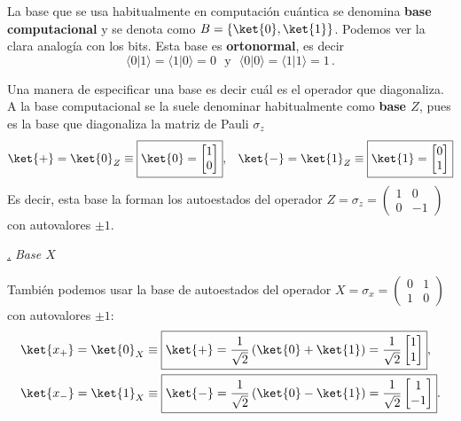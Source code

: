 \documentclass[a4paper,11pt]{book} %
\numberwithin{equation}{chapter}
\def\lp{\left(}
\def\rp{\right)}
\newcommand{\braket}[2]{\langle #1|#2\rangle}
\def\subsubiContadorIt{\par\addtocounter{subsubsection}{1}\underline{\it\thesubsubsection.}\hskip0.5cm \setcounter{subsubsubsectionIt}{0}}
\newcommand{\SubsubiIt}[1]{
		\subsubiContadorIt \textit{#1}
	}
\newcounter{subsubsubsectionIt}[subsubsection]
\begin{document}
La base que se usa habitualmente en computación cuántica se denomina \textbf{base computacional} y se denota como $B = \{ \ket{0}, \ket{1} \}$. Podemos ver la clara analogía con los bits. Esta base es \textbf{ortonormal}, es decir
	\begin{equation}
	\braket{0}{1}=\braket{1}{0}=0 ~~~ \text{y} ~~~ \braket{0}{0}=\braket{1}{1}=1\, .
	\end{equation}

Una manera de especificar una base es decir cuál es el operador que diagonaliza. A la base computacional se la suele denominar habitualmente como \textbf{base $Z$}, pues es la base que diagonaliza la matriz de Pauli $\sigma_z$
	\begin{equation} 
\begin{aligned}
	& \ket{+} = \ket{0}_Z \equiv \boxed{\ket{0} = \begin{bmatrix}  1\\ 0\end{bmatrix}},  
	& \ket{-} = \ket{1}_Z \equiv \boxed{\ket{1} =  \begin{bmatrix}  0\\ 1\end{bmatrix}} 
	\end{aligned}
\end{equation}
Es decir, esta base la forman los autoestados del operador $Z = \sigma_z = \lp \begin{matrix} 1& 0 \\ 0 & -1 \end{matrix} \rp $ con autovalores $\pm 1$. 
 
			\SubsubiIt{Base $X$} 
			
También podemos usar la base de autoestados del operador $X = \sigma_x = \lp \begin{matrix} 0 & 1 \\ 1 & 0 \end{matrix} \rp $ con autovalores $\pm 1$:
	\begin{equation} \label{ec_qubit_x+}
	\begin{split}
	& \ket{x_+} = \ket{0}_X \equiv \boxed{\ket{+} = \frac{1}{\sqrt{2}} \lp \ket{0} + \ket{1} \rp = \frac{1}{\sqrt{2}} \begin{bmatrix}  1 \\ 1  \end{bmatrix}}, \\
	& \ket{x_-} = \ket{1}_X \equiv \boxed{\ket{-} =  \frac{1}{\sqrt{2}} \lp \ket{0} - \ket{1} \rp = \frac{1}{\sqrt{2}} \begin{bmatrix}  1 \\ -1  \end{bmatrix}}. 
	\end{split}
	\end{equation}	
\end{document}
